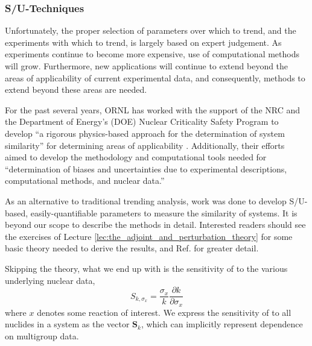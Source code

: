 
\subsubsection{S/U-Techniques}

Unfortunately, the proper selection of parameters over which to trend, 
and the experiments with which to trend, is largely based on expert 
judgement.  As experiments continue to become more expensive, use of 
computational methods will grow.  Furthermore, new applications will 
continue to extend beyond the areas of applicability of current 
experimental data, and consequently, methods to extend beyond these 
areas are needed.

For the past several years, ORNL has worked with the support of the 
NRC and the Department of Energy's (DOE) Nuclear Criticality Safety 
Program to develop ``a rigorous physics-based approach for the 
determination of system similarity'' for determining areas of 
applicability \cite{broadhead2004sau}.  Additionally, their efforts 
aimed to develop the methodology and computational tools needed for 
``determination of biases and uncertainties due to experimental 
descriptions, computational methods, and nuclear data.''

As an alternative to traditional trending analysis, work was done to 
develop S/U-based, easily-quantifiable parameters to measure the 
similarity of systems.  It is beyond our scope to describe the 
methods in detail.  Interested readers should see the exercises
of Lecture \ref{lec:the_adjoint_and_perturbation_theory} for some
basic theory needed to derive the results, and Ref. 
\cite{broadhead2004sau} for greater detail.

Skipping the theory, what we end up with is the sensitivity
of \keff to the various underlying nuclear data, 
\begin{equation}
 S_{k,\sigma_x} = \frac{\sigma_x}{k}\frac{\partial k}{\partial \sigma_x} 
 \label{eq:keffsens}
\end{equation}
where $x$ denotes some reaction of interest.  We express the sensitivity 
of \keff to all nuclides in a system as the vector $\mathbf{S}_k$,
which can implicitly represent dependence on multigroup data.

